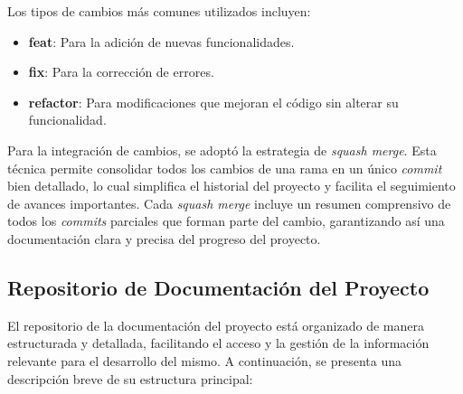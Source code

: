 Los tipos de cambios más comunes utilizados incluyen:
\begin{itemize}
    \item \textbf{feat}: Para la adición de nuevas funcionalidades.
    \item \textbf{fix}: Para la corrección de errores.
    \item \textbf{refactor}: Para modificaciones que mejoran el código sin alterar su funcionalidad.
\end{itemize}

Para la integración de cambios, se adoptó la estrategia de \textit{squash merge}. Esta técnica permite consolidar todos los cambios de una rama en un único \textit{commit} bien detallado, lo cual simplifica el historial del proyecto y facilita el seguimiento de avances importantes. Cada \textit{squash merge} incluye un resumen comprensivo de todos los \textit{commits} parciales que forman parte del cambio, garantizando así una documentación clara y precisa del progreso del proyecto.\par

\subsection{Repositorio de Documentación del Proyecto} \label{sect:wiki}

El repositorio de la documentación del proyecto está organizado de manera estructurada y detallada, facilitando el acceso y la gestión de la información relevante para el desarrollo del mismo. A continuación, se presenta una descripción breve de su estructura principal:

